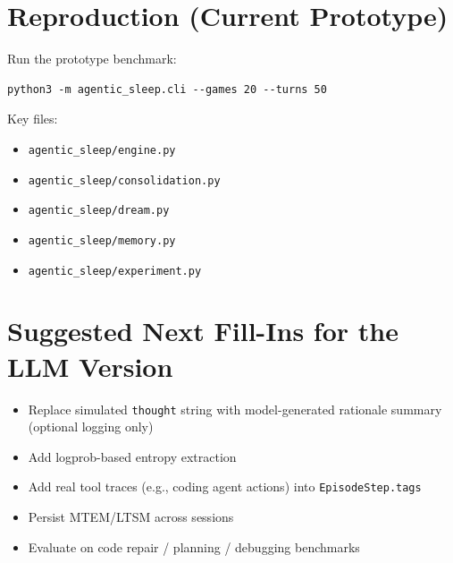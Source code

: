 \documentclass{article}
\begin{document}
\appendix

\section{Reproduction (Current Prototype)}

Run the prototype benchmark:

\begin{verbatim}
python3 -m agentic_sleep.cli --games 20 --turns 50
\end{verbatim}

Key files:
\begin{itemize}[leftmargin=1.25em]
\item \texttt{agentic\_sleep/engine.py}
\item \texttt{agentic\_sleep/consolidation.py}
\item \texttt{agentic\_sleep/dream.py}
\item \texttt{agentic\_sleep/memory.py}
\item \texttt{agentic\_sleep/experiment.py}
\end{itemize}

\section{Suggested Next Fill-Ins for the LLM Version}

\begin{itemize}[leftmargin=1.25em]
\item Replace simulated \texttt{thought} string with model-generated rationale summary (optional logging only)
\item Add logprob-based entropy extraction
\item Add real tool traces (e.g., coding agent actions) into \texttt{EpisodeStep.tags}
\item Persist MTEM/LTSM across sessions
\item Evaluate on code repair / planning / debugging benchmarks
\end{itemize}



\end{document}
